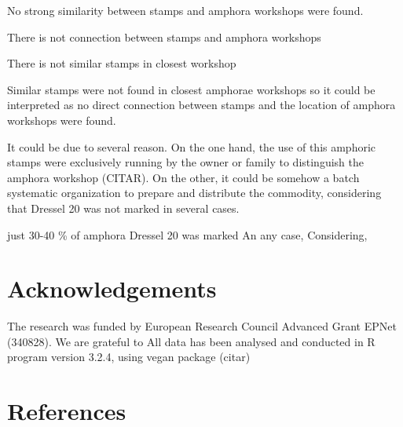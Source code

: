 \documentclass[review]{elsarticle}
\begin{document}
No strong similarity between stamps and amphora workshops were found. 

There is not connection between stamps and amphora workshops

There is not similar stamps in closest workshop 

Similar stamps were not found in closest amphorae workshops so it could be interpreted as no direct connection between stamps and the location of amphora workshops were found. 

It could be due to several reason. On the one hand, the use of this amphoric stamps were exclusively running by the owner or family to distinguish the amphora workshop (CITAR). On the other, it could be somehow a batch systematic organization to prepare and distribute the commodity, considering that Dressel 20 was not marked in several cases. 


just 30-40 \% of amphora Dressel 20 was marked 
An any case, 
Considering, 

\section{Acknowledgements}

The research was funded by European Research Council Advanced Grant EPNet (340828). We are grateful to 
All data has been analysed and conducted in R program version 3.2.4, using vegan package (citar) 


\section{References}


\end{document}
